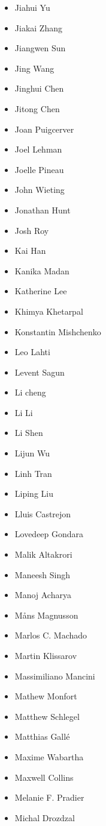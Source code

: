 \begin{multicols}{3}
\begin{itemize}[label={}]
    \item Jiahui Yu
    \item Jiakai Zhang
    \item Jiangwen Sun
    \item Jing Wang
    \item Jinghui Chen
    \item Jitong Chen
    \item Joan Puigcerver
    \item Joel Lehman
    \item Joelle Pineau
    \item John Wieting
    \item Jonathan Hunt
    \item Josh Roy
    \item Kai Han
    \item Kanika Madan
    \item Katherine Lee
    \item Khimya Khetarpal
    \item Konstantin Mishchenko
    \item Leo Lahti
    \item Levent Sagun
    \item Li cheng
    \item Li Li
    \item Li Shen
    \item Lijun Wu
    \item Linh Tran
    \item Liping Liu
    \item Lluis Castrejon
    \item Lovedeep Gondara
    \item Malik Altakrori
    \item Maneesh Singh
    \item Manoj Acharya
    \item Måns Magnusson
    \item Marlos C. Machado
    \item Martin Klissarov
    \item Massimiliano Mancini
    \item Mathew Monfort
    \item Matthew Schlegel
    \item Matthias Gallé
    \item Maxime Wabartha
    \item Maxwell Collins
    \item Melanie F. Pradier
    \item Michal Drozdzal

\end{itemize}
\end{multicols}
